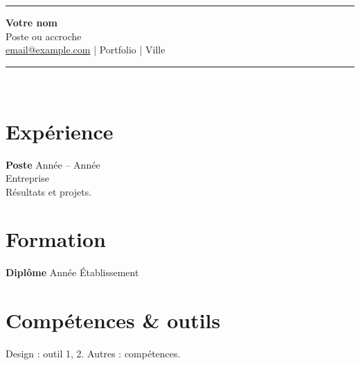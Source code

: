 \documentclass[11pt,a4paper]{article}
\begin{document}
\begin{center}\rule{2.2cm}{2.8cm}\end{center}
\begin{center}
{\LARGE \textbf{Votre nom}}\\[0.15em]
{\color{gray} Poste ou accroche}\\[0.4em]
\href{mailto:email@example.com}{email@example.com} \quad | \quad Portfolio \quad | \quad Ville
\end{center}
\vspace{0.5em}
\noindent\rule{\textwidth}{1pt}\\[0.3em]
\section*{Expérience}
\textbf{Poste} \hfill Année -- Année \\
Entreprise \\
Résultats et projets.

\section*{Formation}
\textbf{Diplôme} \hfill Année \quad Établissement
\section*{Compétences \& outils}
Design : outil 1, 2. \quad Autres : compétences.
\end{document}
